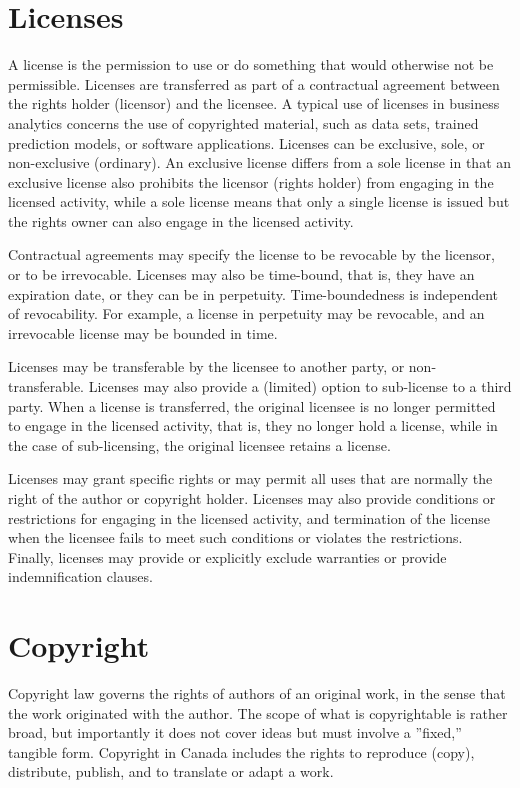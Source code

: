 \section{Licenses}

A license is the permission to use or do something that would otherwise not be permissible. Licenses are transferred as part of a contractual agreement between the rights holder (licensor) and the licensee. A typical use of licenses in business analytics concerns the use of copyrighted material, such as data sets, trained prediction models, or software applications. Licenses can be exclusive, sole, or non-exclusive (ordinary). An exclusive license differs from a sole license in that an exclusive license also prohibits the licensor (rights holder) from engaging in the licensed activity, while a sole license means that only a single license is issued but the rights owner can also engage in the licensed activity. 

Contractual agreements may specify the license to be revocable by the licensor, or to be irrevocable. Licenses may also be time-bound, that is, they have an expiration date, or they can be in perpetuity. Time-boundedness is independent of revocability. For example, a license in perpetuity may be revocable, and an irrevocable license may be bounded in time. 

Licenses may be transferable by the licensee to another party, or non-transferable. Licenses may also provide a (limited) option to sub-license to a third party. When a license is transferred, the original licensee is no longer permitted to engage in the licensed activity, that is, they no longer hold a license, while in the case of sub-licensing, the original licensee retains a license. 

Licenses may grant specific rights or may permit all uses that are normally the right of the author or copyright holder. Licenses may also provide conditions or restrictions for engaging in the licensed activity, and termination of the license when the licensee fails to meet such conditions or violates the restrictions. Finally, licenses may provide or explicitly exclude warranties or provide indemnification clauses.

\section{Copyright}

Copyright law governs the rights of authors of an original work, in the sense that the work originated with the author. The scope of what is copyrightable is rather broad, but importantly it does not cover ideas but must involve a ''fixed,'' tangible form. Copyright in Canada includes the rights to reproduce (copy), distribute, publish, and to translate or adapt a work. 

